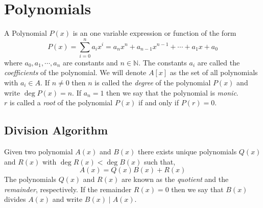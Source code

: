 \documentclass[11pt,numbers=noenddot,svgnames]{scrbook}
\DeclareMathOperator{\Deg}{deg}
\begin{document}
\chapter{Polynomials}

\begin{definition}
    A Polynomial $P(x)$ is an one variable expression or function of the form
    \[
        P(x) = \sum_{i=0}^{n} a_{i}x^{i} = a_{n}x^{n} + a_{n-1}x^{n-1} + \cdots +a_{1}x + a_{0}
    \]
    where $a_{0},a_{1}, \cdots, a_{n}$ are constants and $n \in \mathbb{N}$. The constants $a_{i}$ are called the 
    \textit{coefficients} of the polynomial. We will denote $A[x]$ as the set of all polynomials with $a_{i} \in A$. If 
    $n\neq 0$ then $n$ is called the \textit{degree} of the polynomial $P(x)$ and write $\Deg P(x)=n$. 
    If $a_{n} = 1$ then we say that the polynomial is \textit{monic}. \\
    $r$ is called a \textit{root} of the polynomial $P(x)$ if and only if $P(r)=0$.
\end{definition}

\section{Division Algorithm}

\begin{theorem}\label{thm:division-algorithm}
    Given two polynomial $A(x)$ and $B(x)$ there exists unique polynomials $Q(x)$ and $R(x)$ with $\Deg R(x) < \Deg B(x)$ 
    such that,
    \[
        A(x) = Q(x)B(x) + R(x)
    \]
    The polynomials $Q(x)$ and $R(x)$ are known as the \textit{quotient} and the \textit{remainder}, respectively. If the 
    remainder $R(x)=0$ then we say that $B(x)$ divides $A(x)$ and write $B(x) \mid A(x)$.
\end{theorem}
\end{document}
